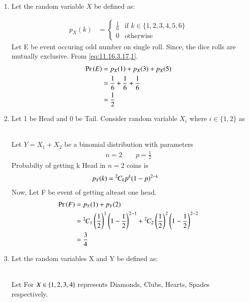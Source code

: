 \documentclass[journal,12pt,twocolumn]{IEEEtran}
\theoremstyle{remark}
\begin{document}
\begin{enumerate}
\item Let the random variable $X$ be defined as:
\begin{table}[!ht]
	
\end{table}
   \begin{align}
        p_X(k) &= 
        \begin{cases}
            \frac{1}{6} & \text{if }k \in \{1, 2, 3, 4, 5, 6\}\\
            0 & \text{otherwise}
        \end{cases}\label{eq:11.16.3.17,1}
    \end{align}
 Let E be event occuring odd number on single roll. Since, the dice rolls are mutually exclusive. From \eqref{eq:11.16.3.17,1}.
 \begin{align}
 \Pr\left(E\right)&=p_X(1)+p_X(3)+p_X(5)\\
 &=\frac{1}{6}+\frac{1}{6}+\frac{1}{6}\\
 &=\frac{1}{2} 
 \end{align}
 \item Let 1 be Head and 0 be Tail. Consider random variable $X_i$ where $i \in \{1,2\}$ as
 \begin{table}[!ht]
	
\end{table}\\
Let $Y=X_1+X_2$ be a binomial distribution with parameters
\begin{align}
n=2 \qquad p=\frac{1}{2}
\end{align}
Probabilty of getting k Head in $n=2$ coins is
\begin{align}
p_Y(k)&={{}^{2}\mkern-1muC_{k}}p^k(1-p)^{2-k}
\end{align}
Now, Let F be event of getting alteast one head.
\begin{align}
\Pr\left(F\right)&=p_Y(1)+p_Y(2)\\
&={{}^{2}\mkern-1muC_{1}}\left(\frac{1}{2}\right)^1\left(1-\frac{1}{2}\right)^{2-1}+{{}^{2}\mkern-1muC_{2}}\left(\frac{1}{2}\right)^2\left(1-\frac{1}{2}\right)^{2-2}\\
&=\frac{3}{4}
\end{align}
\item Let the random variables X and Y be defined as:
\begin{table}[!ht]
	
\end{table}\\
Let For $X \in \left\{1,2,3,4\right\}$ represents Diamonds, Clubs, Hearts, Spades respectively.
\begin{align}

\end{align}
\end{enumerate}
\end{document}
